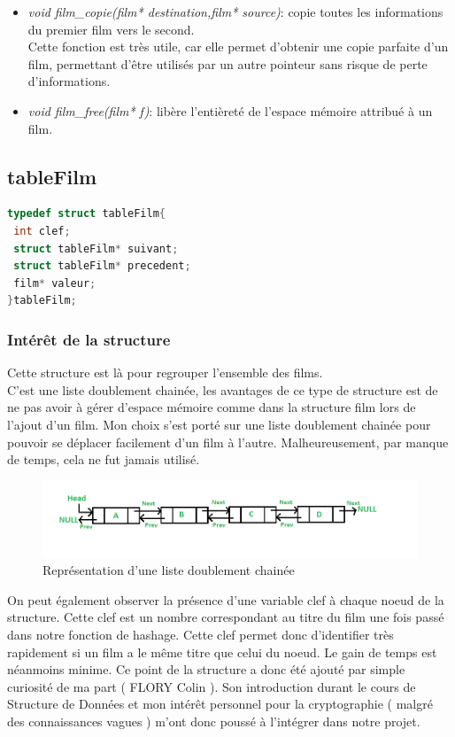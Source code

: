 \documentclass{article}
\begin{document}
\begin{itemize}
        \item \textit{void film\_copie(film* destination,film* source)}: copie toutes les informations du premier film vers le second.\\
    Cette fonction est très utile, car elle permet d'obtenir une copie parfaite d'un film, permettant d'être utilisés par un autre pointeur sans risque de perte d'informations.
    
        \item \textit{void film\_free(film* f)}: libère l'entièreté de l'espace mémoire attribué à un film.
    \end{itemize}



    \subsection{tableFilm}
    \begin{lstlisting}[language=C]
typedef struct tableFilm{
 int clef;
 struct tableFilm* suivant;
 struct tableFilm* precedent;
 film* valeur;
}tableFilm;
    \end{lstlisting}
    \subsubsection{Intérêt de la structure}
    Cette structure est là pour regrouper l'ensemble des films.\\
    C'est une liste doublement chainée, les avantages de ce type de structure est de ne pas avoir à gérer d'espace mémoire comme dans la structure film lors de l'ajout d'un film. Mon choix s'est porté sur une liste doublement chainée pour pouvoir se déplacer facilement d'un film à l'autre. Malheureusement, par manque de temps, cela ne fut jamais utilisé.\\
 \begin{figure}[!h]
    \centering
    \includegraphics[scale=0.6]{DLL1.png}
    \caption{Représentation d'une liste doublement chainée}
    \label{fig:my_label}
\end{figure}
    \par On peut également observer la présence d'une variable clef à chaque noeud de la structure. Cette clef est un nombre correspondant au titre du film une fois passé dans notre fonction de hashage. Cette clef permet donc d'identifier très rapidement si un film a le même titre que celui du noeud. Le gain de temps est néanmoins minime. Ce point de la structure a donc été ajouté par simple curiosité de ma part ( FLORY Colin ). Son introduction durant le cours de Structure de Données et mon intérêt personnel pour la cryptographie ( malgré des connaissances vagues ) m'ont donc poussé à l'intégrer dans notre projet.
\end{document}

